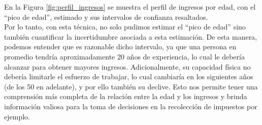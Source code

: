 En la Figura \ref{fig:perfil_ingresos} se muestra el perfil de ingresos por edad, con el ``pico de edad'', estimado y sus intervalos de confianza resaltados.\\

Por lo tanto, con esta técnica, no solo pudimos estimar el ``pico de edad'' sino también cuantificar la incertidumbre asociada a esta estimación. De esta manera, podemos entender que es razonable dicho intervalo, ya que una persona en promedio tendría aproximadamente 20 años de experiencia, lo cual le debería alcanzar para obtener mayores ingresos. Adicionalmente, su capacidad física no debería limitarle el esfuerzo de trabajar, lo cual cambiaría en los siguientes años (de los 50 en adelante), y por ello también su declive. Esto nos permite tener una comprensión más completa de la relación entre la edad y los ingresos y brinda información valiosa para la toma de decisiones en la recolección de impuestos por ejemplo.



